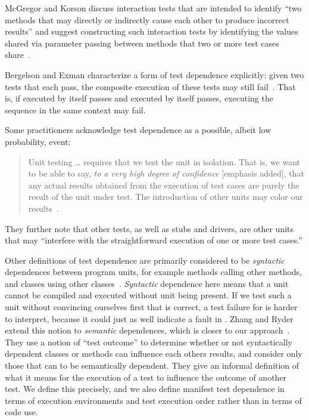 McGregor and Korson discuss interaction tests that
are intended to identify ``two methods that may directly or indirectly
cause each other to produce incorrect results'' and suggest constructing such
interaction tests by identifying the values shared via parameter passing
between methods
 that two or more test cases share~\cite[p~.69]{mcgregoretal:CACM:1994}.

Bergelson and Exman characterize a form of test dependence
explicitly: given two tests that each pass, the composite
execution of these tests may still
fail~\cite[p.~38]{bergelsonetal:EEE:2006}.  That is, if 
 executed by itself passes and  executed by itself passes,
executing the sequence  in the same context may fail.

Some practitioners acknowledge test dependence as a possible, albeit low probability, event:
\begin{quote}
Unit testing \dots  
requires that we test the unit in isolation. That is, we
want to be able to say, \emph{to a very high degree of confidence} [emphasis added], that
any actual results obtained from the execution of test cases are
purely the result of the unit under test. The introduction of
other units may color our results~\cite{unit-test-def}.
\end{quote}
They further note that other tests, as well as stubs and drivers, are
other units that may ``interfere with the straightforward
execution of one or more test cases.''

Other definitions of test dependence are primarily considered
to be \textit{syntactic} dependences between program units, for example
methods calling other methods, and classes using other classes~\cite{bergelsonetal:EEE:2006,briandetal:SEKE:2002}. 
\emph{Syntactic} dependence here means that a unit  cannot be
compiled and executed without unit  being present. If we test
such a unit  without convincing ourselves first that 
is correct, a test failure for  is harder to interpret,
because it could just as well indicate a fault in .
Zhang and Ryder extend this notion to \emph{semantic} dependences,
which is closer to our approach~\cite{zhangetal:TR:2006}. 
They use a notion of
``test outcome'' to determine whether or not syntactically dependent
classes or methods can influence each others results, and consider
only those that can to be semantically dependent.
They give an informal definition of what it means for the execution of a
test to influence the outcome of another test.  We define
this precisely, and we also define manifest test dependence in terms
of execution environments
and test execution order rather than in terms of code use.

